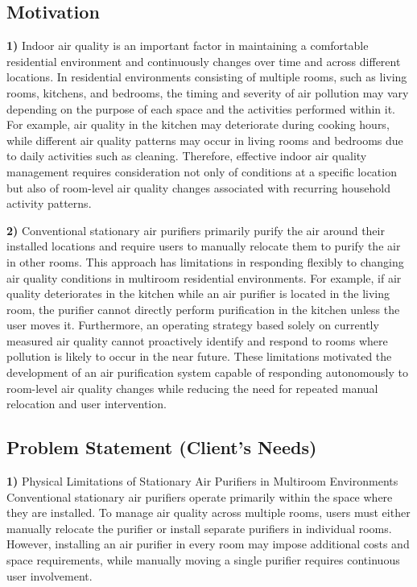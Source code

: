 \documentclass[conference]{IEEEtran}
\begin{document}
\subsection{Motivation}
\par\noindent\textbf{1)} Indoor air quality is an important factor in maintaining a comfortable residential environment and continuously changes over time and across different locations. In residential environments consisting of multiple rooms, such as living rooms, kitchens, and bedrooms, the timing and severity of air pollution may vary depending on the purpose of each space and the activities performed within it. For example, air quality in the kitchen may deteriorate during cooking hours, while different air quality patterns may occur in living rooms and bedrooms due to daily activities such as cleaning. Therefore, effective indoor air quality management requires consideration not only of conditions at a specific location but also of room-level air quality changes associated with recurring household activity patterns.
\par\noindent\textbf{2)} Conventional stationary air purifiers primarily purify the air around their installed locations and require users to manually relocate them to purify the air in other rooms. This approach has limitations in responding flexibly to changing air quality conditions in multiroom residential environments. For example, if air quality deteriorates in the kitchen while an air purifier is located in the living room, the purifier cannot directly perform purification in the kitchen unless the user moves it. Furthermore, an operating strategy based solely on currently measured air quality cannot proactively identify and respond to rooms where pollution is likely to occur in the near future. These limitations motivated the development of an air purification system capable of responding autonomously to room-level air quality changes while reducing the need for repeated manual relocation and user intervention.
\subsection{Problem Statement (Client's Needs)}
\par\noindent\textbf{1)} Physical Limitations of Stationary Air Purifiers in Multiroom Environments
Conventional stationary air purifiers operate primarily within the space where they are installed. To manage air quality across multiple rooms, users must either manually relocate the purifier or install separate purifiers in individual rooms. However, installing an air purifier in every room may impose additional costs and space requirements, while manually moving a single purifier requires continuous user involvement.
\end{document}
